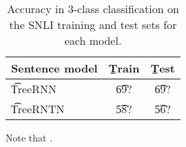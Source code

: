 \begin{table}
\begin{center}
\begin{tabular}{l@{\hskip \colspaceL}@{\hskip \colspaceL}c@{\hskip \colspaceL}c}
\hline
\textbf{Sentence model} & \b{Train}  & \b{Test}\\
\hline
\t{TreeRNN}            & \t{69?} & \t{69?} \\
\t{TreeRNTN}            & \t{58?} & \t{56?} \\
\hline
\end{tabular}
\end{center}
\caption{
\label{tab:nnresults}
Accuracy in 3-class classification on the SNLI training and test sets for each model.
}
\end{table}

Note that .
